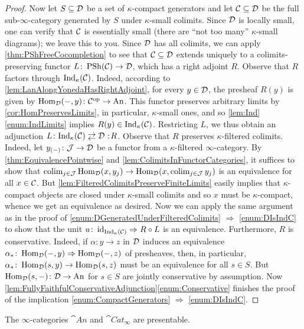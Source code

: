 \begin{proof}
	Now let $S\subseteq \mathcal{D}$ be a set of $\kappa$-compact generators and let $\mathcal{C}\subseteq \mathcal{D}$ be the full sub-$\infty$-category generated by $S$ under $\kappa$-small colimits. Since $\mathcal{D}$ is locally small, one can verify that $\mathcal{C}$ is essentially small (there are \enquote{not too many} $\kappa$-small diagrams); we leave this to you. Since $\mathcal{D}$ has all colimits, we can apply \cref{thm:PShFreeCocompletion} to see that $\mathcal{C}\subseteq\mathcal{D}$ extends uniquely to a colimits-preserving functor $L\colon \operatorname{PSh}(\mathcal{C})\rightarrow\mathcal{D}$, which has a right adjoint $R$. Observe that $R$ factors through $\mathrm{Ind}_\kappa(\mathcal{C})$. Indeed, according to \cref{lem:LanAlongYonedaHasRightAdjoint}, for every $y\in\mathcal{D}$, the presheaf $R(y)$ is given by $\operatorname{Hom}_{\mathcal{D}}(-,y)\colon\mathcal{C}^{\mathrm{op}}\rightarrow\mathrm{An}$. This functor preserves arbitrary limits by \cref{cor:HomPreservesLimits}, in particular, $\kappa$-small ones, and so \cref{lem:Ind}\cref{enum:IndLimits} implies $R(y)\in\mathrm{Ind}_\kappa(\mathcal{C})$. Restricting $L$, we thus obtain an adjunction $L\colon\cat{Ind}_\kappa(\Cc)\shortdoublelrmorphism\Dd\noloc R$. Observe that $R$ preserves $\kappa$-filtered colimits. Indeed, let $y_{(-)}\colon \mathcal{J}\rightarrow\mathcal{D}$ be a functor from a $\kappa$-filtered $\infty$-category. By \cref{thm:EquivalencePointwise} and \cref{lem:ColimitsInFunctorCategories}, it suffices to show that $\operatorname*{colim}_{j\in\mathcal{J}}\operatorname{Hom}_{\mathcal{D}}(x,y_j)\rightarrow \operatorname{Hom}_{\mathcal{D}}(x,\operatorname*{colim}_{j\in\mathcal{J}}y_j)$ is an equivalence for all $x\in\mathcal{C}$. But \cref{lem:FilteredColimitsPreserveFiniteLimits} easily implies that $\kappa$-compact objects are closed under $\kappa$-small colimits and so $x$ must be $\kappa$-compact, whence we get an equivalence as desired. Now we can apply the same argument as in the proof of \cref{enum:DGeneratedUnderFilteredColimits} $\Rightarrow$ \cref{enum:DIsIndC} to show that the unit $u\colon \operatorname{id}_{\mathrm{Ind}_\kappa(\mathcal{C})}\Rightarrow R\circ L$ is an equivalence. Furthermore, $R$ is conservative. Indeed, if $\alpha\colon y\rightarrow z$ in $\mathcal{D}$ induces an equivalence $\alpha_*\colon \operatorname{Hom}_{\mathcal{D}}(-,y)\Rightarrow \operatorname{Hom}_{\mathcal{D}}(-,z)$ of presheaves, then, in particular, $\alpha_*\colon\operatorname{Hom}_{\mathcal{D}}(s,y)\rightarrow\operatorname{Hom}_{\mathcal{D}}(s,z)$ must be an equivalence for all $s\in S$. But $\operatorname{Hom}_{\mathcal{D}}(s,-)\colon \mathcal{D}\rightarrow\mathrm{An}$ for $s\in S$ are jointly conservative by assumption. Now \cref{lem:FullyFaithfulConservativeAdjunction}\cref{enum:Conservative} finishes the proof of the implication \cref{enum:CompactGenerators} $\Rightarrow$ \cref{enum:DIsIndC}.
\end{proof}
\begin{cor}\label{cor:AnPresentable}
	The $\infty$-categories $\cat{An}$ and $\cat{Cat}_\infty$ are presentable.
\end{cor}
